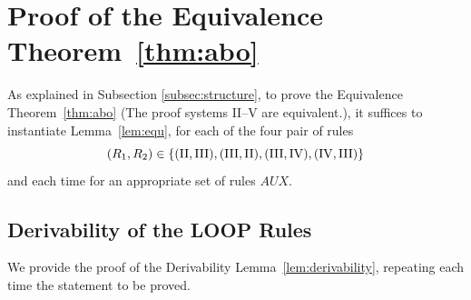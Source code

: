 \documentclass[manuscript, screen, review]{acmart}
\newcommand{\AUX}{\mathit{AUX}}
\begin{document}







\section{Proof of the Equivalence Theorem~\ref{thm:abo}}
\label{sec:proof}

As explained in Subsection \ref{subsec:structure}, to prove the
Equivalence Theorem~\ref{thm:abo} (The proof systems II--V are equivalent.),
it suffices to instantiate Lemma~\ref{lem:equ}, 
for each of the four pair of rules
\[
  (R_1, R_2) \in \mbox{$\{{(\mathrm{II}, \mathrm{III}),
    (\mathrm{III},\mathrm{II}),
    (\mathrm{III}, \mathrm{IV}),
    (\mathrm{IV}, \mathrm{III})}\}$}
\]
and each time for an appropriate set of rules $\AUX$.


\subsection{Derivability of the LOOP Rules}
\label{subsec:proof-derivability}

We provide the proof of the Derivability Lemma~\ref{lem:derivability}, 
repeating each time the statement to be proved.



\end{document}
